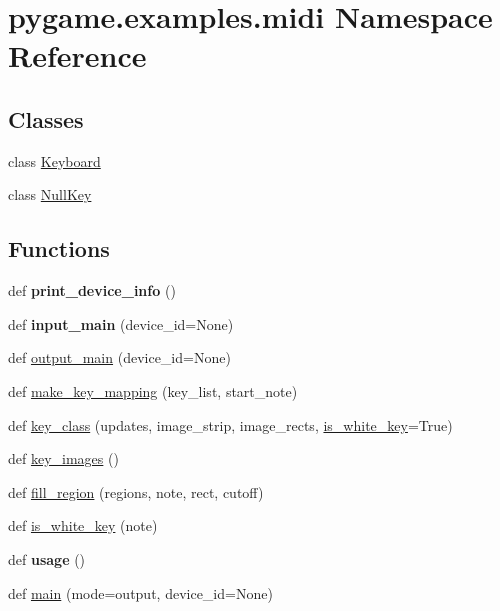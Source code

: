 \hypertarget{namespacepygame_1_1examples_1_1midi}{}\section{pygame.\+examples.\+midi Namespace Reference}
\label{namespacepygame_1_1examples_1_1midi}
\subsection*{Classes}
\begin{DoxyCompactItemize}
\item 
class \hyperlink{classpygame_1_1examples_1_1midi_1_1_keyboard}{Keyboard}
\item 
class \hyperlink{classpygame_1_1examples_1_1midi_1_1_null_key}{Null\+Key}
\end{DoxyCompactItemize}
\subsection*{Functions}
\begin{DoxyCompactItemize}
\item 
\mbox{\label{namespacepygame_1_1examples_1_1midi_af8914c37d9e995d87c98f145e2a6970b}} 
def {\bfseries print\+\_\+device\+\_\+info} ()
\item 
\mbox{\label{namespacepygame_1_1examples_1_1midi_a38bf0ebea900aec74c20b8e3cb0b2fae}} 
def {\bfseries input\+\_\+main} (device\+\_\+id=None)
\item 
def \hyperlink{namespacepygame_1_1examples_1_1midi_ae161dbc463946f041f8f1c0cb2676e0b}{output\+\_\+main} (device\+\_\+id=None)
\item 
def \hyperlink{namespacepygame_1_1examples_1_1midi_a749f20282593918b41853e2d9e43d765}{make\+\_\+key\+\_\+mapping} (key\+\_\+list, start\+\_\+note)
\item 
def \hyperlink{namespacepygame_1_1examples_1_1midi_a6847638ad406203f6e1595bc910326d0}{key\+\_\+class} (updates, image\+\_\+strip, image\+\_\+rects, \hyperlink{namespacepygame_1_1examples_1_1midi_a6f297edb18a87cbad5dffd2cab7903f7}{is\+\_\+white\+\_\+key}=True)
\item 
def \hyperlink{namespacepygame_1_1examples_1_1midi_a033e6692a39db20d70c604209f388e02}{key\+\_\+images} ()
\item 
def \hyperlink{namespacepygame_1_1examples_1_1midi_aad53e9f7989680c93ad32887ca7f833a}{fill\+\_\+region} (regions, note, rect, cutoff)
\item 
def \hyperlink{namespacepygame_1_1examples_1_1midi_a6f297edb18a87cbad5dffd2cab7903f7}{is\+\_\+white\+\_\+key} (note)
\item 
\mbox{\label{namespacepygame_1_1examples_1_1midi_a1c3d79b16a584a495262c0577f0b143e}} 
def {\bfseries usage} ()
\item 
def \hyperlink{namespacepygame_1_1examples_1_1midi_adaa61334b0feded68d7da651d0045d63}{main} (mode=\textquotesingle{}output\textquotesingle{}, device\+\_\+id=None)
\end{DoxyCompactItemize}
